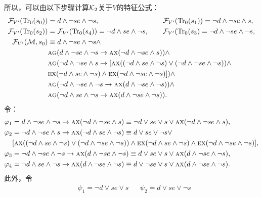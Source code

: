 \begin{example}[例1的延续]
所以，可以由以下步骤计算${\cal K}_2$关于$V$的特征公式：
\begin{align*}
	{\cal F}_{V'}(\textrm{Tr}_0(s_0)) &= d \wedge \neg se \wedge \neg s, \qquad \qquad \qquad \qquad \quad {\cal F}_{V'}(\textrm{Tr}_0(s_1)) = \neg d \wedge \neg se \wedge s, \\
	{\cal F}_{V'} (\textrm{Tr}_0(s_2)) &= {\cal F}_{V'} (\textrm{Tr}_0(s_4)) = \neg d \wedge se \wedge \neg s,  \qquad  {\cal F}_{V'}(\textrm{Tr}_0(s_3) = \neg d \wedge \neg se\wedge \neg s,\\
	{\cal F}_{V'}({\cal M}, s_0)& \equiv d \wedge \neg se \wedge \neg s \wedge \\
	& \textsc{a} \textsc{g}(d \wedge \neg se \wedge \neg s \rightarrow \textsc{a}\textsc{x}(\neg d \wedge \neg se \wedge s))\wedge \\
	& \textsc{a} \textsc{g}(\neg d \wedge \neg se \wedge s \rightarrow [\textsc{a}\textsc{x}((\neg d \wedge se \wedge \neg s) \vee (\neg d \wedge \neg se\wedge \neg s)) \wedge\\ &\textsc{e}\textsc{x}(\neg d \wedge se \wedge \neg s) \wedge \textsc{e}\textsc{x} (\neg d \wedge \neg se\wedge \neg s)]) \wedge\\
	& \textsc{a} \textsc{g}(\neg d \wedge \neg se\wedge \neg s \rightarrow \textsc{a}\textsc{x}(d \wedge \neg se \wedge \neg s)) \wedge\\
	& \textsc{a} \textsc{g}(\neg d \wedge se \wedge \neg s \rightarrow \textsc{a}\textsc{x}(d \wedge \neg se \wedge \neg s)).
\end{align*}
令：
\begin{align*}
	\varphi_1&  = d \wedge \neg se \wedge \neg s \rightarrow \textsc{a}\textsc{x}(\neg d \wedge \neg se \wedge s)\equiv \neg d \vee se \vee s \vee \textsc{a}\textsc{x}(\neg d \wedge \neg se \wedge s),\\
	\varphi_2& = \neg d \wedge \neg se \wedge s \rightarrow \textsc{a}\textsc{x}(\neg d \wedge se \wedge \neg s) \equiv d \vee  se \vee \neg s \vee\\
	& [\textsc{a}\textsc{x}((\neg d \wedge se \wedge \neg s) \vee (\neg d \wedge \neg se\wedge \neg s)) \wedge\textsc{e}\textsc{x}(\neg d \wedge se \wedge \neg s) \wedge \textsc{e}\textsc{x} (\neg d \wedge \neg se\wedge \neg s)],\\
	\varphi_3 &=\neg d \wedge \neg se\wedge \neg s \rightarrow \textsc{a}\textsc{x}(d \wedge \neg se \wedge \neg s)\equiv d \vee se \vee s \vee \textsc{a}\textsc{x}(d \wedge \neg se \wedge \neg s),\\
	\varphi_4 &= \neg d \wedge se \wedge \neg s \rightarrow \textsc{a}\textsc{x}(d \wedge \neg se \wedge \neg s)\equiv d \vee \neg se \vee s \vee \textsc{a}\textsc{x}(d \wedge \neg se \wedge \neg s).
\end{align*}
此外，令
\begin{align*}
	& \psi_1 = \neg d \vee se \vee s && \psi_2 = d \vee  se \vee \neg s \\

\end{align*}
\end{example}
